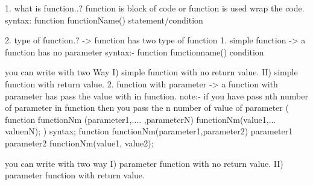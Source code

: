 1. what is function..?
 function is block of code or function is used wrap the code.
 syntax: 
      function functionName(){
                                      statement/condition
                                }
                                
2. type of function.?
-> function has two type of function 
            1. simple function      
            -> a function has no parameter
                  syntax:- function functionname(){
                        condition
                  }

                  you can write with two Way
                        I) simple function with no return value.
                        II) simple function with return value.
            2. function with parameter
            -> a function with parameter has pass the value with  in function.
            note:- if you have pass nth number of  parameter in function then you pass the n number of value of parameter
                        ( function functionNm (parameter1,.... ,parameterN)
                                    functionNm(value1,... valuenN);
                        )
            syntax;
            function functionNm(parameter1,parameter2)
            {
                  parameter1
                  parameter2
            } 
            functionNm(value1, value2);

            you can write with two way
            I) parameter function with no return value.
            II) parameter function with return value.

